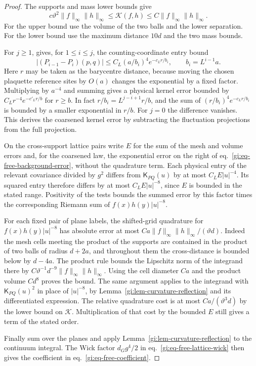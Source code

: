 \documentclass[11pt,letterpaper,reqno]{amsart}
\numberwithin{equation}{section}
\renewcommand{\eqref}[1]{\textup{eq.~\ref{#1}}}
\theoremstyle{definition}
\theoremstyle{remark}
\begin{document}
\begin{proof}
The supports and mass lower bounds give
\[
        c\vartheta^2\|f\|_\infty\|h\|_\infty
        \le \mathcal K(f,h)\le C\|f\|_\infty\|h\|_\infty.
\]
For the upper bound use the volume of the two balls and
the lower separation. For the lower bound use the maximum
distance \(10d\) and the two mass bounds.

For \(j\ge1\), \cite[Proposition~6.4]{MB} gives, for
\(1\le i\le j\), the counting-coordinate entry bound
\[
  |(P_{i-1}-P_i)(p,q)|
     \le C_L(a/b_i)^4 e^{-c_L r/b_i},
                         \qquad b_i=L^{i-1}a .
\]
Here \(r\) may be taken as the barycentre distance, because
moving the chosen plaquette reference sites by \(O(a)\)
changes the exponential by a fixed factor.
Multiplying by \(a^{-4}\) and summing gives a physical kernel
error bounded by \(C_L r^{-4}e^{-c'_L r/b}\) for \(r\ge b\).
In fact \(r/b_i=L^{j-i+1}r/b\), and the sum of
\((r/b_i)^4 e^{-c_L r/b_i}\) is bounded by a smaller
exponential in \(r/b\). For \(j=0\) the difference vanishes.
This derives the coarsened kernel error by subtracting
the fluctuation projections from the full projection.

On the cross-support lattice pairs write \(E\) for the
sum of the mesh and volume errors and, for the coarsened
law, the exponential error on the right of
\eqref{gi:eq-free-background-error}, without the quadrature
term. Each physical entry of the relevant covariance
divided by \(g^2\) differs from
\(\mathsf K_{PQ}(u)\) by at most \(C_L E|u|^{-4}\).
Its squared entry therefore differs by at most
\(C_L E|u|^{-8}\), since \(E\) is bounded in the stated
range. Positivity of the tests bounds the summed error by
this factor times the corresponding Riemann sum of
\(f(x)h(y)|u|^{-8}\).

For each fixed pair of plane labels, the shifted-grid
quadrature for \(f(x)h(y)|u|^{-8}\) has absolute error at
most \(C a\|f\|_\infty\|h\|_\infty/(\vartheta d)\).
Indeed the mesh cells meeting the product of the supports
are contained in the product of two balls of radius
\(d+2a\), and throughout them the cross-distance is
bounded below by \(d-4a\). The product rule bounds the
Lipschitz norm of the integrand there by
\(C\vartheta^{-1}d^{-9}\|f\|_\infty\|h\|_\infty\).
Using the cell diameter \(Ca\) and the product volume
\(Cd^8\) proves the bound. The same argument applies to
the integrand with \(\mathsf K_{PQ}(u)^2\) in place of
\(|u|^{-8}\), by Lemma~\ref{gi:lem-curvature-reflection}
and its differentiated expression.
The relative quadrature cost is at most
\(Ca/(\vartheta^3d)\) by the lower bound on \(\mathcal K\).
Multiplication of that cost by the bounded \(E\) still
gives a term of the stated order.

Finally sum over the planes and apply
Lemma~\ref{gi:lem-curvature-reflection} to the continuum
integral. The Wick factor \(d_Gg^4/2\) in
\eqref{gi:eq-free-lattice-wick} then gives the coefficient
in \eqref{gi:eq-free-coefficient}.
\end{proof}
\end{document}
